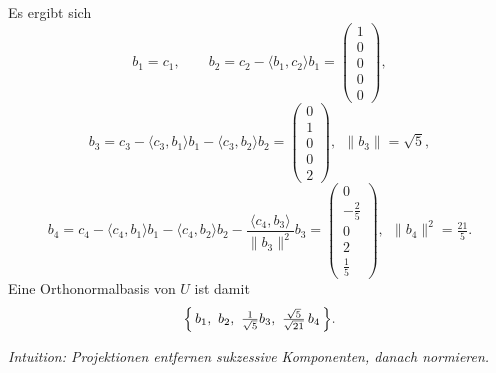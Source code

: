 \documentclass[11pt, a4paper]{article}
\begin{document}
\begin{enumerate}
\begin{framed}
\[  \]
  Es ergibt sich
  \[
  b_1=c_1,\qquad
  b_2=c_2-\langle b_1,c_2\rangle b_1=\begin{pmatrix}1\\0\\0\\0\\0\end{pmatrix},
  \]
  \[
  b_3=c_3-\langle c_3,b_1\rangle b_1-\langle c_3,b_2\rangle b_2
      =\begin{pmatrix}0\\1\\0\\0\\2\end{pmatrix},\ \ \|b_3\|=\sqrt5,
  \]
  \[
  b_4=c_4-\langle c_4,b_1\rangle b_1-\langle c_4,b_2\rangle b_2
      -\frac{\langle c_4,b_3\rangle}{\|b_3\|^2}b_3
      =\begin{pmatrix}0\\-\tfrac{2}{5}\\0\\2\\\tfrac{1}{5}\end{pmatrix},
      \ \ \|b_4\|^2=\tfrac{21}{5}.
  \]
  Eine Orthonormalbasis von $U$ ist damit
  \[
  \Bigl\{\,b_1,\ b_2,\ \tfrac{1}{\sqrt5}b_3,\ \tfrac{\sqrt5}{\sqrt{21}}\,b_4\,\Bigr\}.
  \]

  \medskip\noindent\textit{Intuition: Projektionen entfernen sukzessive Komponenten, danach normieren.}
  \end{framed}


\end{enumerate}
\end{document}
